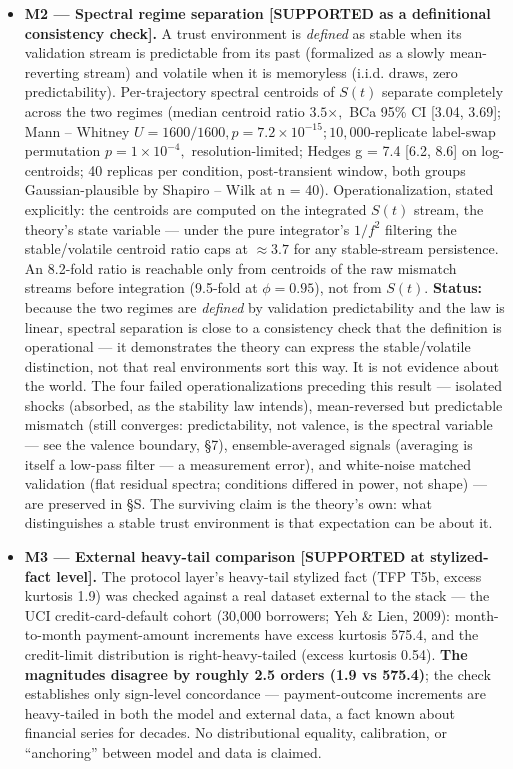 \documentclass[11pt,twocolumn]{article}
\theoremstyle{gttdef}
\theoremstyle{gttplain}
\begin{document}
\begin{itemize}
\item \textbf{M2 --- Spectral regime separation [SUPPORTED as a definitional consistency check].} A trust environment is \emph{defined} as stable when its validation stream is predictable from its past (formalized as a slowly mean-reverting stream) and volatile when it is memoryless (i.i.d. draws, zero predictability). Per-trajectory spectral centroids of $S(t)$ separate completely across the two regimes (median centroid ratio $3.5\times,$ BCa 95\% CI [3.04, 3.69]; Mann -- Whitney $U = 1600/1600, p = 7.2 \times 10^{-15}; 10,000$-replicate label-swap permutation $p = 1 \times 10^{-4},$ resolution-limited; Hedges g = 7.4 [6.2, 8.6] on log-centroids; 40 replicas per condition, post-transient window, both groups Gaussian-plausible by Shapiro -- Wilk at n = 40). Operationalization, stated explicitly: the centroids are computed on the integrated $S(t)$ stream, the theory's state variable --- under the pure integrator's $1/f^{2}$ filtering the stable/volatile centroid ratio caps at $\approx 3.7$ for any stable-stream persistence. An 8.2-fold ratio is reachable only from centroids of the raw mismatch streams before integration (9.5-fold at $\phi = 0.95$), not from $S(t).$ \textbf{Status:} because the two regimes are \emph{defined} by validation predictability and the law is linear, spectral separation is close to a consistency check that the definition is operational --- it demonstrates the theory can express the stable/volatile distinction, not that real environments sort this way. It is not evidence about the world. The four failed operationalizations preceding this result --- isolated shocks (absorbed, as the stability law intends), mean-reversed but predictable mismatch (still converges: predictability, not valence, is the spectral variable --- see the valence boundary, \S{}7), ensemble-averaged signals (averaging is itself a low-pass filter --- a measurement error), and white-noise matched validation (flat residual spectra; conditions differed in power, not shape) --- are preserved in \S{}S. The surviving claim is the theory's own: what distinguishes a stable trust environment is that expectation can be about it.

\item \textbf{M3 --- External heavy-tail comparison [SUPPORTED at stylized-fact level].} The protocol layer's heavy-tail stylized fact (TFP T5b, excess kurtosis 1.9) was checked against a real dataset external to the stack --- the UCI credit-card-default cohort (30,000 borrowers; Yeh \& Lien, 2009): month-to-month payment-amount increments have excess kurtosis 575.4, and the credit-limit distribution is right-heavy-tailed (excess kurtosis 0.54). \textbf{The magnitudes disagree by roughly 2.5 orders (1.9 vs 575.4)}; the check establishes only sign-level concordance --- payment-outcome increments are heavy-tailed in both the model and external data, a fact known about financial series for decades. No distributional equality, calibration, or ``anchoring'' between model and data is claimed.

\end{itemize}
\end{document}
